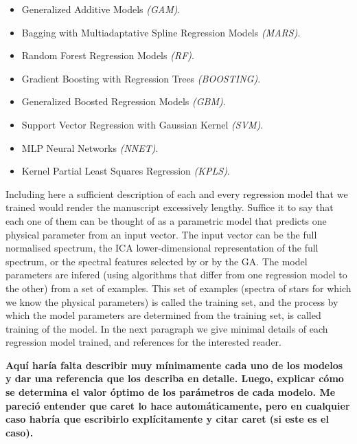 \begin{itemize}
 \item {Generalized Additive Models \emph{(GAM)}.}
 \item {Bagging with Multiadaptative Spline Regression Models \emph{(MARS)}.}
 \item {Random Forest Regression Models \emph{(RF)}.} 
 \item {Gradient Boosting with Regression Trees \emph{(BOOSTING)}.}
 \item {Generalized Boosted Regression Models \emph{(GBM)}.}
 \item {Support Vector Regression with Gaussian Kernel \emph{(SVM)}.}
 \item {MLP Neural Networks \emph{(NNET)}.}
 \item {Kernel Partial Least Squares Regression \emph{(KPLS)}.}
 \end{itemize}


Including here a sufficient description of each and every regression
model that we trained would render the manuscript excessively
lengthy. Suffice it to say that each one of them can be thought of as
a parametric model that predicts one physical parameter from an input
vector. The input vector can be the full normalised spectrum, the ICA
lower-dimensional representation of the full spectrum, or the spectral
features selected by \cite{cesetti} or by the GA. The model parameters
are infered (using algorithms that differ from one regression model to
the other) from a set of examples. This set of examples (spectra of
stars for which we know the physical parameters) is called the
training set, and the process by which the model parameters are
determined from the training set, is called training of the model. In
the next paragraph we give minimal details of each regression model
trained, and references for the interested reader.

{\bf Aquí haría falta describir muy mínimamente cada uno de los
modelos y dar una referencia que los describa en detalle. Luego,
explicar cómo se determina el valor óptimo de los parámetros de cada
modelo. Me pareció entender que caret lo hace automáticamente, pero en
cualquier caso habría que escribirlo explícitamente y citar caret (si
este es el caso).}

